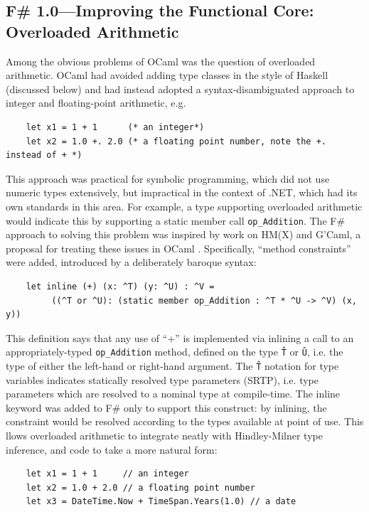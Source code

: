 \documentclass[acmsmall]{acmart}\settopmatter{}
\begin{document}
\subsection*{F\# 1.0---Improving the Functional Core: Overloaded Arithmetic}

Among the obvious problems of OCaml was the question of overloaded arithmetic.  OCaml had avoided adding type classes in the style of Haskell (discussed below) and had instead adopted a syntax-disambiguated approach to integer and floating-point arithmetic, e.g.

\begin{verbatim}
    let x1 = 1 + 1      (* an integer*)
    let x2 = 1.0 +. 2.0 (* a floating point number, note the +. instead of + *)
\end{verbatim}

This approach was practical for symbolic programming, which did not use numeric types extensively, but impractical in the context of .NET, which had its own
standards in this area. For example, a type supporting overloaded arithmetic would indicate this by supporting a static member call \texttt{op\_Addition}.
The F\# approach to solving this problem was inspired by work on HM(X) and G'Caml, a proposal for treating these issues in OCaml \citep{Furuse2002}.
Specifically, “method constraints” were added, introduced by a deliberately baroque syntax:

\begin{verbatim}
    let inline (+) (x: ^T) (y: ^U) : ^V = 
         ((^T or ^U): (static member op_Addition : ^T * ^U -> ^V) (x, y))
\end{verbatim}

This definition says that any use of “+” is implemented via inlining a call to an appropriately-typed \texttt{op\_Addition} method, defined on
the type \texttt{\^T} or \texttt{\^U}, i.e. the type of either the left-hand or right-hand argument.  The \texttt{\^T} notation for type variables
indicates statically resolved type parameters (SRTP), i.e. type parameters which are resolved to a nominal type at compile-time.  The inline keyword
was added to F\# only to support this construct: by inlining, the constraint would be resolved according to the types available at point of use. This 
llows overloaded arithmetic to integrate neatly with Hindley-Milner type inference, and code to take a more natural form:

\begin{verbatim}
    let x1 = 1 + 1     // an integer
    let x2 = 1.0 + 2.0 // a floating point number
    let x3 = DateTime.Now + TimeSpan.Years(1.0) // a date
\end{verbatim}
\end{document}
